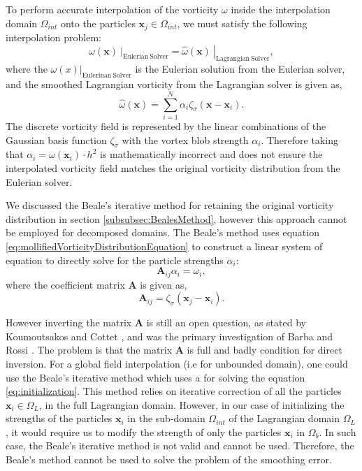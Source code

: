 To perform accurate interpolation of the vorticity $\omega$ inside the interpolation domain $\Omega_{int}$ onto the particles $\mathbf{x}_j \in \Omega_{int}$, we must satisfy the following interpolation problem:
	\begin{equation}
	\left. \omega(\mathbf{x})\  \right|_{\mathrm{Eulerian\ Solver}} = 
	\left. \hat{\omega}(\mathbf{x})\  \right|_{\mathrm{Lagrangian\ Solver}},
	\end{equation}
where the $\left. \omega(x) \right|_{\mathrm{Eulerinan\ Solver}}$ is the Eulerian solution from the Eulerian solver, and the smoothed Lagrangian vorticity from the Lagrangian solver is given as,
	\begin{equation}
	\hat{\omega}(\mathbf{x}) = \sum_{i=1}^{N} \alpha_i \zeta_{\sigma}(\mathbf{x} - \mathbf{x}_i).
	\label{eq:mollifiedVorticityDistributionEquation}
	\end{equation}
The discrete vorticity field is represented by the linear combinations of the Gaussian basis function $\zeta_{\sigma}$ with the vortex blob strength $\alpha_i$. Therefore taking that $\alpha_i = \omega(\mathbf{x}_i)\cdot{h^2}$ is mathematically incorrect and does not ensure the interpolated vorticity field matches the original vorticity distribution from the Eulerian solver.

We discussed the Beale's iterative method for retaining the original vorticity distribution in section {\color{plotRed}{?????}} \ref{subsubsec:BealesMethod}, however this approach cannot be employed for decomposed domains. The Beale's method uses equation \ref{eq:mollifiedVorticityDistributionEquation} to construct a linear system of equation to directly solve for the particle strengths $\alpha_i$:
\begin{equation}
\mathbf{A}_{ij}\alpha_i = \omega_i,
\end{equation}
where the coefficient matrix $\mathbf{A}$ is given as,
\begin{equation}
\mathbf{A}_{ij} = \zeta_{\sigma}(\mathbf{x}_j-\mathbf{x}_i).
\label{eq:initialization}
\end{equation}

However inverting the matrix $\mathbf{A}$ is still an open question, as stated by Koumoutsakos and Cottet \cite{Cottet2000a}, and was the primary investigation of Barba and Rossi \cite{Barba2010a}. The problem is that the matrix $\mathbf{A}$ is full and badly condition for direct inversion. For a global field interpolation (i.e for unbounded domain), one could use the Beale's iterative method which uses a  for solving the equation \ref{eq:initialization}. This method relies on iterative correction of all the particles $\mathbf{x}_i \in \Omega_L$, in the full Lagrangian domain. However, in our case of initializing the strengths of the particles $\mathbf{x}_i$ in the sub-domain $\Omega_{int}$ of the Lagrangian domain $\Omega_L$, it would require us to modify the strength of only the particles $\mathbf{x}_i$ in $\Omega_b$. In such case, the Beale's iterative method is not valid and cannot be used. Therefore, the Beale's method cannot be used to solve the problem of the smoothing error.

